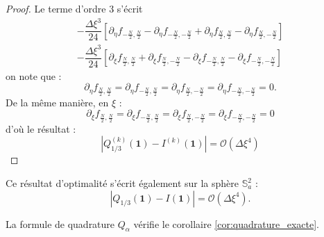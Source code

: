 \begin{proof}
Le terme d'ordre 3 s'écrit
\begin{multline}
- \dfrac{\Delta \xi^3}{24} \left[ \partial_{\eta} f_{-\frac{N}{2},\frac{N}{2}} - \partial_{\eta} f_{-\frac{N}{2},-\frac{N}{2}} + \partial_{\eta} f_{\frac{N}{2},\frac{N}{2}} -\partial_{\eta} f_{\frac{N}{2},-\frac{N}{2}}  \right] \\
-\dfrac{\Delta \xi^3}{24} \left[ \partial_{\xi} f_{\frac{N}{2},\frac{N}{2}} + \partial_{\xi} f_{\frac{N}{2},-\frac{N}{2}} - \partial_{\xi} f_{-\frac{N}{2},\frac{N}{2}} -\partial_{\xi} f_{-\frac{N}{2},-\frac{N}{2}}  \right]
\label{eq:opimalite alpha 3}
\end{multline}
on note que :
\begin{equation}
\partial_{\eta} f_{\frac{N}{2},\frac{N}{2}} = \partial_{\eta} f_{-\frac{N}{2},\frac{N}{2}} = \partial_{\eta} f_{\frac{N}{2},-\frac{N}{2}} = \partial_{\eta} f_{-\frac{N}{2},-\frac{N}{2}} = 0.
\end{equation}
De la même manière, en $\xi$ :
\begin{equation}
\partial_{\xi} f_{\frac{N}{2},\frac{N}{2}} = \partial_{\xi} f_{-\frac{N}{2},\frac{N}{2}} = \partial_{\xi} f_{\frac{N}{2},-\frac{N}{2}} = \partial_{\xi} f_{-\frac{N}{2},-\frac{N}{2}} = 0 
\end{equation}
d'où le résultat :
\begin{equation}
|Q_{1/3}^{(k)}(\mathbf{1}) - I^{(k)}(\mathbf{1}) | = \mathcal{O}\left( \Delta \xi^4 \right)
\end{equation}
\end{proof}

\begin{remarque}
Ce résultat d'optimalité s'écrit également sur la sphère $\mathbb{S}_a^2$ :
\begin{equation}
|Q_{1/3}(\mathbf{1}) - I(\mathbf{1}) | = \mathcal{O}\left( \Delta \xi^4 \right).
\end{equation}
\end{remarque}

\begin{remarque}
La formule de quadrature $Q_{\alpha}$ vérifie le corollaire \ref{cor:quadrature_exacte}.
\end{remarque}





















